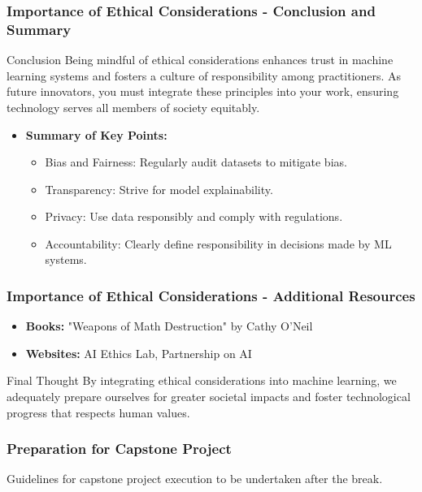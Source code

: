 \documentclass[aspectratio=169]{beamer}
\begin{document}
\begin{frame}[fragile]
    \frametitle{Importance of Ethical Considerations - Conclusion and Summary}
    \begin{block}{Conclusion}
        Being mindful of ethical considerations enhances trust in machine learning systems and fosters a culture of responsibility among practitioners. As future innovators, you must integrate these principles into your work, ensuring technology serves all members of society equitably.
    \end{block}
    
    \begin{itemize}
        \item \textbf{Summary of Key Points:}
        \begin{itemize}
            \item Bias and Fairness: Regularly audit datasets to mitigate bias.
            \item Transparency: Strive for model explainability.
            \item Privacy: Use data responsibly and comply with regulations.
            \item Accountability: Clearly define responsibility in decisions made by ML systems.
        \end{itemize}
    \end{itemize}
\end{frame}

\begin{frame}[fragile]
    \frametitle{Importance of Ethical Considerations - Additional Resources}
    \begin{itemize}
        \item \textbf{Books:} "Weapons of Math Destruction" by Cathy O'Neil
        \item \textbf{Websites:} AI Ethics Lab, Partnership on AI
    \end{itemize}
    
    \begin{block}{Final Thought}
        By integrating ethical considerations into machine learning, we adequately prepare ourselves for greater societal impacts and foster technological progress that respects human values.
    \end{block}
\end{frame}

\begin{frame}
    \frametitle{Preparation for Capstone Project}
    Guidelines for capstone project execution to be undertaken after the break.
\end{frame}
\end{document}
